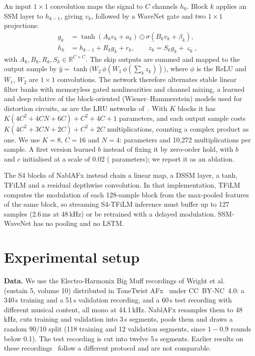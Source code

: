 \documentclass{article}
\newcommand{\R}{\mathbb{R}}
\begin{document}
An input $1\times1$ convolution maps the signal to $C$ channels $h_0$. Block $k$
applies an SSM layer to $h_{k-1}$, giving $v_k$, followed by a WaveNet gate and
two $1\times1$ projections:
\begin{align}
g_k &= \tanh(A_k v_k + a_k) \odot \sigma(B_k v_k + \beta_k), \label{eq:gate}\\
h_k &= h_{k-1} + R_k g_k + r_k, \qquad z_k = S_k g_k + \varsigma_k, \label{eq:res}
\end{align}
with $A_k, B_k, R_k, S_k \in \R^{C\times C}$. The skip outputs are summed and
mapped to the output sample by $\hat{y} = \tanh\big(W_2\,\phi(W_1\,
\phi(\sum_k z_k))\big)$, where $\phi$ is the ReLU and $W_1$, $W_2$ are $1\times1$
convolutions. The network therefore alternates stable linear filter banks with
memoryless gated nonlinearities and channel mixing, a learned and deep relative
of the block-oriented (Wiener--Hammerstein) models used for distortion
circuits, as are the LRU networks of~\cite{esqueda2025lru}. With $K$ blocks it
has $K(4C^2 + 4CN + 6C) + C^2 + 4C + 1$ parameters, and each output sample costs
$K(4C^2 + 3CN + 2C) + C^2 + 2C$ multiplications, counting a complex product as
one. We use $K=8$, $C=16$ and $N=4$: \SSMparamsExact{} parameters and 10{,}272
multiplications per sample. A first version learned $b$ instead of fixing it by
zero-order hold, with $b$ and $c$ initialised at a scale of 0.02
(\VoneSSMparamsExact{} parameters); we report it as an ablation.

The S4 blocks of NablAFx instead chain a linear map, a DSSM layer, a tanh, TFiLM
and a residual depthwise convolution. In that implementation, TFiLM computes the
modulation of each 128-sample block from the max-pooled features of the same
block, so streaming S4-TFiLM inference must buffer up to 127 samples
(2.6\,ms at 48\,kHz) or be retrained with a delayed modulation. SSM-WaveNet has
no pooling and no LSTM.

\section{Experimental setup}
\label{sec:setup}

\textbf{Data.} We use the Electro-Harmonix Big Muff recordings of Wright et
al.~\cite{wright2019realtime} (sustain 5, volume 10) distributed in ToneTwist
AFx~\cite{comunita2025tonetwist, wright2024tonetwistbigmuff} under CC~BY-NC~4.0: a 340\,s training and a
51\,s validation recording, and a 60\,s test recording with different musical
content, all mono at 44.1\,kHz. NablAFx resamples them to 48\,kHz, cuts training
and validation into 3\,s segments, pools them and draws a random 90/10 split
(118 training and 12 validation segments, since $1-0.9$ rounds below 0.1). The test recording is cut into
twelve 5\,s segments. Earlier results on these recordings~\cite{wright2019realtime}
follow a different protocol and are not comparable.
\end{document}
